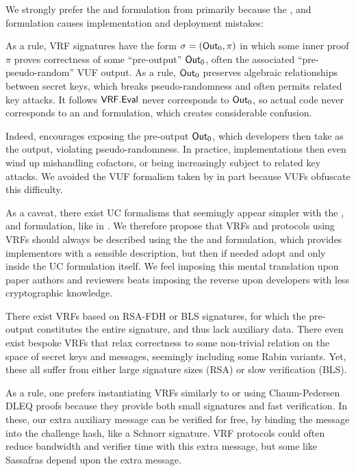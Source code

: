 We strongly prefer the \Sign and \Verify formulation from \cite{agg_dkg}
primarily because the , and 
formulation causes implementation and deployment mistakes:

As a rule, VRF signatures have the form $\sigma = ({\mathsf{Out}}_0,\pi)$ in which
some inner proof $\pi$ proves correctness of some ``pre-output'' ${\mathsf{Out}}_0$,
 often the associated ``pre-pseudo-random'' VUF output.
As a rule, ${\mathsf{Out}}_0$ preserves algebraic relationships between secret keys,
 which breaks pseudo-randomness and often permits related key attacks.
It follows ${\mathsf{VRF}}.{\mathsf{Eval}}$ never corresponds to ${\mathsf{Out}}_0$, so actual code never
corresponds to an  and  formulation,
 which creates considerable confusion.

Indeed,  encourages exposing the pre-output ${\mathsf{Out}}_0$,
which developers then take as the output, violating pseudo-randomness. 
In practice, implementations then even wind up mishandling cofactors,
 or being increasingly subject to related key attacks.
We avoided the VUF formalism taken by \cite{agg_dkg} in part because VUFs obfuscate this difficulty.

As a caveat, there exist UC formalisms that seemingly appear simpler
with the , and  formulation,
like in \cite{praos}.
We therefore propose that VRFs and protocols using VRFs should always be
described using the the \Sign and \Verify formulation, which provides
implementors with a sensible description, but then if needed adopt
  and  only inside the UC formulation itself.
We feel imposing this mental translation upon paper authors and reviewers
 beats imposing the reverse upon developers with less cryptographic knowledge.

\smallskip

There exist VRFs based on RSA-FDH or BLS signatures, for which the
pre-output constitutes the entire signature, and thus lack auxiliary data. 
There even exist bespoke VRFs that relax correctness to some non-trivial
relation on the space of secret keys and messages,
 seemingly including some Rabin variants. 
Yet, these all suffer from either large signature sizes (RSA) or
 slow verification (BLS).

As a rule, one prefers instantiating VRFs similarly to
 \cite{nsec5} or \cite{VXEd25519} using Chaum-Pedersen DLEQ proofs \cite{CP92} %
 because they provide both small signatures and fast verification.
In these, our extra auxiliary message \aux can be verified for free,
by binding the message into the challenge hash, like a Schnorr signature.
VRF protocols could often reduce bandwidth and verifier time with
this extra message, but some like Sassafras depend upon the extra message.



